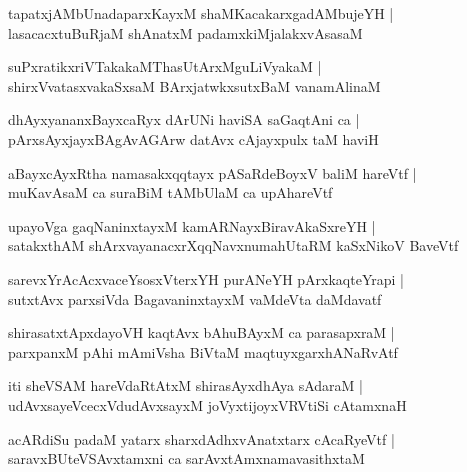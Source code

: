 \documentclass[twoside,12pt,openright]{book}
\newcounter{shloka}[chapter]
\begin{document}
\begin{shloka}%
tapatxjAMbUnadaparxKayxM shaMKacakarxgadAMbujeYH |\\
lasacacxtuBuRjaM shAnatxM padamxkiMjalakxvAsasaM 
\end{shloka}

\begin{shloka}%
suPxratikxriVTakakaMThasUtArxMguLiVyakaM |\\
shirxVvatasxvakaSxsaM BArxjatwkxsutxBaM vanamAlinaM 
\end{shloka}

\begin{shloka}%
dhAyxyananxBayxcaRyx dArUNi haviSA saGaqtAni ca |\\
pArxsAyxjayxBAgAvAGArw  datAvx cAjayxpulx taM haviH
\end{shloka}

\begin{shloka}%
aBayxcAyxRtha namasakxqqtayx pASaRdeBoyxV baliM hareVtf |\\
muKavAsaM ca suraBiM tAMbUlaM  ca  upAhareVtf 
\end{shloka}

\begin{shloka}%
upayoVga gaqNaninxtayxM kamARNayxBiravAkaSxreYH |\\
satakxthAM shArxvayanacxrXqqNavxnumahUtaRM kaSxNikoV BaveVtf 
\end{shloka}

\begin{shloka}%
sarevxYrAcAcxvaceYsosxVterxYH purANeYH pArxkaqteYrapi |\\
sutxtAvx parxsiVda BagavaninxtayxM vaMdeVta daMdavatf
\end{shloka}

\begin{shloka}%
shirasatxtApxdayoVH kaqtAvx bAhuBAyxM ca parasapxraM |\\
parxpanxM pAhi  mAmiVsha BiVtaM maqtuyxgarxhANaRvAtf 
\end{shloka}

\begin{shloka}%
iti sheVSAM hareVdaRtAtxM shirasAyxdhAya sAdaraM |\\
udAvxsayeVcecxVdudAvxsayxM joVyxtijoyxVRVtiSi cAtamxnaH 
\end{shloka}

\begin{shloka}%
acARdiSu padaM yatarx sharxdAdhxvAnatxtarx cAcaRyeVtf |\\
saravxBUteVSAvxtamxni ca sarAvxtAmxnamavasithxtaM 
\end{shloka}
\end{document}
